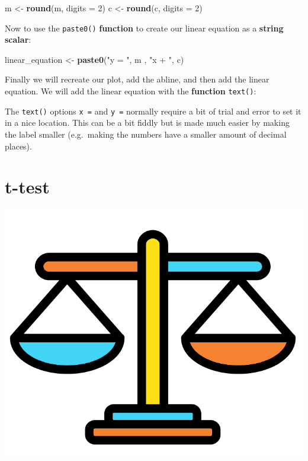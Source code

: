 \documentclass[]{book}
\newenvironment{Shaded}{\begin{snugshade}}{\end{snugshade}}
\newcommand{\KeywordTok}[1]{\textcolor[rgb]{0.13,0.29,0.53}{\textbf{#1}}}
\newcommand{\DataTypeTok}[1]{\textcolor[rgb]{0.13,0.29,0.53}{#1}}
\newcommand{\DecValTok}[1]{\textcolor[rgb]{0.00,0.00,0.81}{#1}}
\newcommand{\StringTok}[1]{\textcolor[rgb]{0.31,0.60,0.02}{#1}}
\newcommand{\OperatorTok}[1]{\textcolor[rgb]{0.81,0.36,0.00}{\textbf{#1}}}
\newcommand{\NormalTok}[1]{#1}
\begin{document}
\begin{Shaded}
\begin{Highlighting}[]
\NormalTok{m <-}\StringTok{ }\KeywordTok{round}\NormalTok{(m, }\DataTypeTok{digits =} \DecValTok{2}\NormalTok{)}
\NormalTok{c <-}\StringTok{ }\KeywordTok{round}\NormalTok{(c, }\DataTypeTok{digits =} \DecValTok{2}\NormalTok{)}
\end{Highlighting}
\end{Shaded}

Now to use the \texttt{paste0()} \textbf{function} to create our linear
equation as a \textbf{string scalar}:

\begin{Shaded}
\begin{Highlighting}[]
\NormalTok{linear_equation <-}\StringTok{ }\KeywordTok{paste0}\NormalTok{(}\StringTok{"y = "}\NormalTok{, m , }\StringTok{"x + "}\NormalTok{, c)}
\end{Highlighting}
\end{Shaded}

Finally we will recreate our plot, add the abline, and then add the
linear equation. We will add the linear equation with the
\textbf{function} \texttt{text()}:

\begin{Shaded}
\end{Shaded}

The \texttt{text()} options \texttt{x\ =} and \texttt{y\ =} normally
require a bit of trial and error to set it in a nice location. This can
be a bit fiddly but is made much easier by making the label smaller
(e.g.~making the numbers have a smaller amount of decimal places).

\section{t-test}\label{t-test}

\begin{center}\includegraphics[width=0.2\linewidth]{figures/scale} \end{center}
\end{document}
